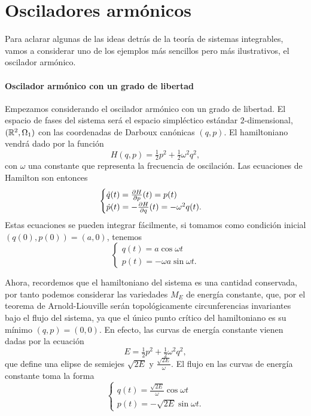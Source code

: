\section{Osciladores armónicos}
Para aclarar algunas de las ideas detrás de la teoría de sistemas integrables, vamos a considerar uno de los ejemplos más sencillos pero más ilustrativos, el oscilador armónico.

\paragraph{\bf Oscilador armónico con un grado de libertad}\mbox{}

  Empezamos considerando el oscilador armónico con un grado de libertad. El espacio de fases del sistema será el espacio simpléctico estándar $2$-dimensional, $(\mathbb{R}^2,\Omega_1)$ con las coordenadas de Darboux canónicas $(q,p)$. El hamiltoniano vendrá dado por la función
  \begin{equation*}
    H(q,p)=\tfrac{1}{2}p^2+\tfrac{1}{2}\omega^2 q^2,
  \end{equation*}
  con $\omega$ una constante que representa la frecuencia de oscilación.
  Las ecuaciones de Hamilton son entonces
  \begin{equation*}
    \begin{cases}
      \dot q(t) = \frac{\partial H}{\partial p}(t)=p(t)\\
    \dot p(t) = -\frac{\partial H}{\partial q}(t)=-\omega^2q(t).
  \end{cases}
  \end{equation*}
  Estas ecuaciones se pueden integrar fácilmente, si tomamos como condición inicial $(q(0),p(0))=(a,0)$, tenemos
  \begin{equation*}
    \begin{cases}
   q(t)=a\cos\omega t \\ 
   p(t)=-\omega a\sin\omega t.
 \end{cases}
  \end{equation*}
  
  Ahora, recordemos que el hamiltoniano del sistema es una cantidad conservada, por tanto podemos considerar las variedades $M_E$ de energía constante, que, por el teorema de Arnold-Liouville serán topológicamente circunferencias invariantes bajo el flujo del sistema, ya que el único punto crítico del hamiltoniano es su mínimo $(q,p)=(0,0)$. En efecto, las curvas de energía constante vienen dadas por la ecuación
  \begin{equation*}
    E=\tfrac{1}{2}p^2+\tfrac{1}{2}\omega^2q^2,
  \end{equation*}
  que define una elipse de semiejes $\sqrt{2E}$ y $\frac{\sqrt{2E}}{\omega}$. El flujo en las curvas de energía constante toma la forma
  \begin{equation*}
    \begin{cases}
      q(t)=\frac{\sqrt{2E}}{\omega}\cos\omega t \\ 
      p(t)=-\sqrt{2E}\sin\omega t.
 \end{cases}
  \end{equation*}
  
